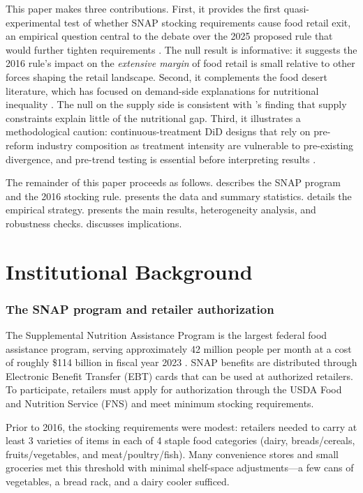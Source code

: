 \documentclass[12pt]{article}
\begin{document}
This paper makes three contributions. First, it provides the first quasi-experimental test of whether SNAP stocking requirements cause food retail exit, an empirical question central to the debate over the 2025 proposed rule that would further tighten requirements \citep{freedman2023snap}. The null result is informative: it suggests the 2016 rule's impact on the \textit{extensive margin} of food retail is small relative to other forces shaping the retail landscape. Second, it complements the food desert literature, which has focused on demand-side explanations for nutritional inequality \citep{allcott2019food, handbury2015goods}. The null on the supply side is consistent with \citeauthor{allcott2019food}'s finding that supply constraints explain little of the nutritional gap. Third, it illustrates a methodological caution: continuous-treatment DiD designs that rely on pre-reform industry composition as treatment intensity are vulnerable to pre-existing divergence, and pre-trend testing is essential before interpreting results \citep{roth2023pretrends}.

The remainder of this paper proceeds as follows.  describes the SNAP program and the 2016 stocking rule.  presents the data and summary statistics.  details the empirical strategy.  presents the main results, heterogeneity analysis, and robustness checks.  discusses implications.


\section{Institutional Background}
\label{sec:background}

\subsubsection*{The SNAP program and retailer authorization} The Supplemental Nutrition Assistance Program is the largest federal food assistance program, serving approximately 42 million people per month at a cost of roughly \$114 billion in fiscal year 2023 \citep{hoynes2016snap}. SNAP benefits are distributed through Electronic Benefit Transfer (EBT) cards that can be used at authorized retailers. To participate, retailers must apply for authorization through the USDA Food and Nutrition Service (FNS) and meet minimum stocking requirements.

Prior to 2016, the stocking requirements were modest: retailers needed to carry at least 3 varieties of items in each of 4 staple food categories (dairy, breads/cereals, fruits/vegetables, and meat/poultry/fish). Many convenience stores and small groceries met this threshold with minimal shelf-space adjustments---a few cans of vegetables, a bread rack, and a dairy cooler sufficed.
\end{document}
